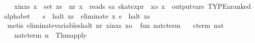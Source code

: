 \begin{isabellebody}
\ \ \ x{}in{}xs{}\ {}x\ {}\ set\ xs{}\ \ nr{}\ {}x\ {}\ reads\ {}s{}{}{}a\ skat{}expr{}{}\ \ xo{}\ {}x\ {}\ output{}vars\ TYPE{}{}a{}{}ranked{}alphabet{}{}\isanewline
\ \ \ {}{}s{}\ {}\ halt\ xs\ {}\ {}eliminate\ x\ s{}\ {}\ halt\ xs{}\isanewline
%
\isadelimproof
\ \ %
\endisadelimproof
%
\isatagproof
{}\isamarkupfalse%
\ {}metis\ eliminate{}variables{}halt\ nr\ x{}in{}xs\ xo{}%
\endisatagproof
{\isafoldproof}%
%
\isadelimproof
\isanewline
%
\endisadelimproof
%
\isadelimML
\isanewline
%
\endisadelimML
%
\isatagML
{}\isamarkupfalse%
\ {}\isanewline
\isanewline
fun\ nat{}cterm\ {}\ {}\ %
\isaantiq
cterm\ {}{}{}{}nat{}{}%
\endisaantiq
\isanewline
\ \ {}\ nat{}cterm\ n\ {}\ Thm{}apply\ %

\end{isabellebody}
